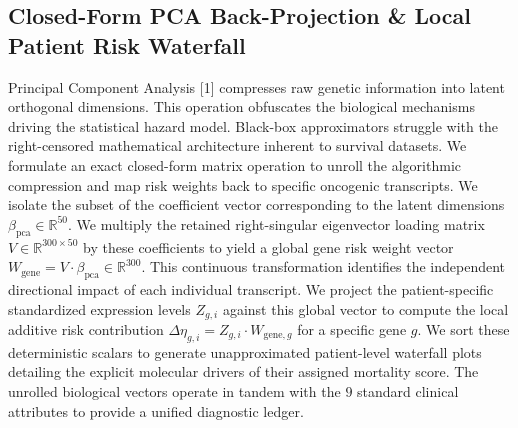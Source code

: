 \subsection{Closed-Form PCA Back-Projection \& Local Patient Risk Waterfall}
Principal Component Analysis [1] compresses raw genetic information into latent orthogonal dimensions. This operation obfuscates the biological mechanisms driving the statistical hazard model. Black-box approximators struggle with the right-censored mathematical architecture inherent to survival datasets. We formulate an exact closed-form matrix operation to unroll the algorithmic compression and map risk weights back to specific oncogenic transcripts. We isolate the subset of the coefficient vector corresponding to the latent dimensions $\beta_{\text{pca}} \in \mathbb{R}^{50}$. We multiply the retained right-singular eigenvector loading matrix $V \in \mathbb{R}^{300 \times 50}$ by these coefficients to yield a global gene risk weight vector $W_{\text{gene}} = V \cdot \beta_{\text{pca}} \in \mathbb{R}^{300}$. This continuous transformation identifies the independent directional impact of each individual transcript. We project the patient-specific standardized expression levels $Z_{g,i}$ against this global vector to compute the local additive risk contribution $\Delta \eta_{g,i} = Z_{g,i} \cdot W_{\text{gene},g}$ for a specific gene $g$. We sort these deterministic scalars to generate unapproximated patient-level waterfall plots detailing the explicit molecular drivers of their assigned mortality score. The unrolled biological vectors operate in tandem with the $9$ standard clinical attributes to provide a unified diagnostic ledger.
